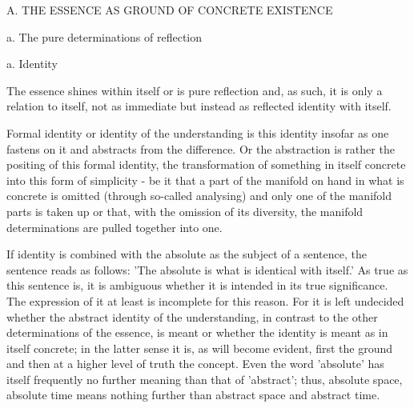 A. THE ESSENCE AS GROUND OF CONCRETE EXISTENCE

a. The pure determinations of reflection

a. Identity

The essence shines within itself or is pure reflection and, as such,
it is only a relation to itself, not as immediate but instead as
reflected identity with itself.

    Formal identity or identity of the understanding is this identity
    insofar as one fastens on it and abstracts from the difference.
    Or the abstraction is rather the positing of this formal identity,
    the transformation of something in itself concrete into this form of
    simplicity - be it that a part of the manifold on hand in what is
    concrete is omitted (through so-called analysing) and only one of the
    manifold parts is taken up or that, with the omission of its diversity,
    the manifold determinations are pulled together into one.

    If identity is combined with the absolute as the subject of a sentence,
    the sentence reads as follows:
    'The absolute is what is identical with itself.'
    As true as this sentence is, it is ambiguous whether it is intended
    in its true significance.
    The expression of it at least is incomplete for this reason.
    For it is left undecided whether the abstract identity of the understanding,
    in contrast to the other determinations of the essence, is meant or
    whether the identity is meant as in itself concrete;
    in the latter sense it is, as will become evident,
    first the ground and then at a higher level of truth the concept.
    Even the word 'absolute' has itself frequently no further
    meaning than that of 'abstract';
    thus, absolute space, absolute time means nothing further than
    abstract space and abstract time.

